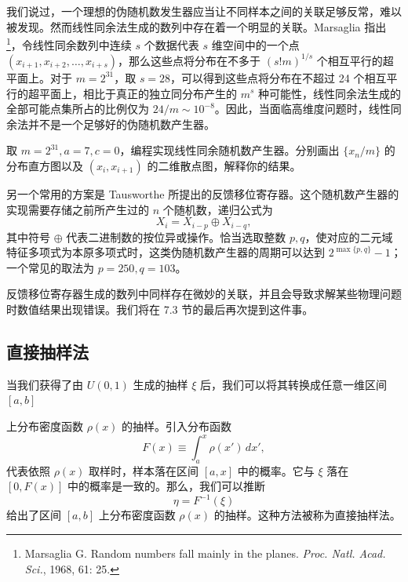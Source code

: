 我们说过，一个理想的伪随机数发生器应当让不同样本之间的关联足够反常，难以被发现。然而线性同余法生成的数列中存在着一个明显的关联。Marsaglia 指出\footnote{Marsaglia G. Random numbers fall mainly in the planes. \emph{Proc. Natl. Acad. Sci.}, 1968, 61: 25.}，令线性同余数列中连续 $s$ 个数据代表 $s$ 维空间中的一个点 $(x_{i+1},x_{i+2},\ldots,x_{i+s})$，那么这些点将分布在不多于 $(s!m)^{1/s}$ 个相互平行的超平面上。对于 $m=2^{31}$，取 $s=28$，可以得到这些点将分布在不超过 24 个相互平行的超平面上，相比于真正的独立同分布产生的 $m^s$ 种可能性，线性同余法生成的全部可能点集所占的比例仅为 $24/m\sim10^{-8}$。因此，当面临高维度问题时，线性同余法并不是一个足够好的伪随机数产生器。

\begin{exerciseBox}[练习 7.1]
取 $m=2^{31},a=7,c=0$，编程实现线性同余随机数产生器。分别画出 $\{x_n/m\}$ 的分布直方图以及 $(x_i,x_{i+1})$ 的二维散点图，解释你的结果。
\end{exerciseBox}

另一个常用的方案是 Tausworthe 所提出的反馈移位寄存器。这个随机数产生器的实现需要存储之前所产生过的 $n$ 个随机数，递归公式为
\begin{equation}
 X_i=X_{i-p}\oplus X_{i-q},
\tag{7.1.15}
\end{equation}
其中符号 $\oplus$ 代表二进制数的按位异或操作。恰当选取整数 $p,q$，使对应的二元域特征多项式为本原多项式时，这类伪随机数产生器的周期可以达到 $2^{\max\{p,q\}}-1$；一个常见的取法为 $p=250,q=103$。

反馈移位寄存器生成的数列中同样存在微妙的关联，并且会导致求解某些物理问题时数值结果出现错误。我们将在 7.3 节的最后再次提到这件事。

\subsection{直接抽样法}

当我们获得了由 $U(0,1)$ 生成的抽样 $\xi$ 后，我们可以将其转换成任意一维区间 $[a,b]$

上分布密度函数 $\rho(x)$ 的抽样。引入分布函数
\begin{equation}
 F(x)\equiv\int_a^x\rho(x')\,dx',
\tag{7.1.16}
\end{equation}
代表依照 $\rho(x)$ 取样时，样本落在区间 $[a,x]$ 中的概率。它与 $\xi$ 落在 $[0,F(x)]$ 中的概率是一致的。那么，我们可以推断
\begin{equation}
 \eta=F^{-1}(\xi)
\tag{7.1.17}
\end{equation}
给出了区间 $[a,b]$ 上分布密度函数 $\rho(x)$ 的抽样。这种方法被称为直接抽样法。

